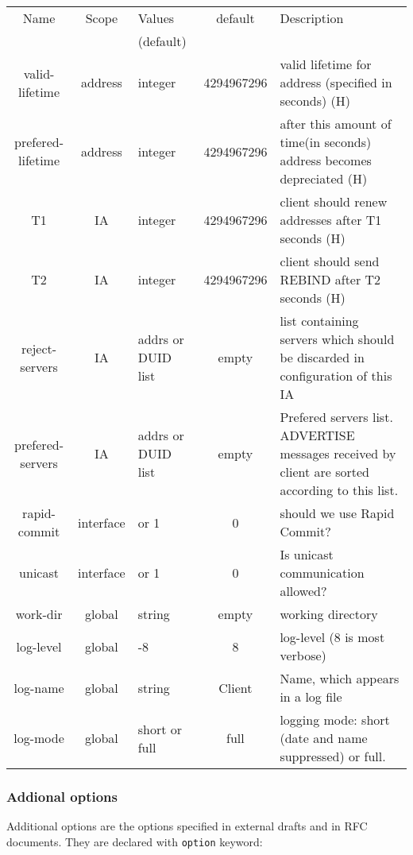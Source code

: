 \begin{center}
\begin{tabular}{|c|c|>{\centering}p{1.7cm}<{}|c|p{6cm}|}
\hline
Name              & Scope   & Values     & default    & Description \\
                  &         & (default)  &            & \\
\hline
valid-lifetime    & address & integer    & 4294967296 & valid lifetime for address (specified in seconds) (H)\\
prefered-lifetime & address & integer    & 4294967296 & after this amount of time(in seconds) address becomes depreciated (H)\\
T1                & IA      & integer    & 4294967296 & client should renew addresses after T1 seconds (H)\\
T2                & IA      & integer    & 4294967296 & client should send REBIND after T2 seconds (H)\\
reject-servers    & IA      & addrs or
                             DUID list  & empty      & list containing servers which should be discarded in configuration of this IA \\
prefered-servers  & IA      & addrs or 
                             DUID list  & empty      & Prefered servers list. ADVERTISE messages received by client are sorted according to this list. \\
rapid-commit      &interface& 0 or 1     & 0          & should we use Rapid Commit? \\
unicast           &interface& 0 or 1     & 0          & Is unicast communication allowed? \\
work-dir          & global  & string     & empty      & working directory \\
log-level         & global  & 1-8        & 8          & log-level (8 is most verbose) \\
log-name          & global  & string     & Client     & Name, which appears in a log file\\
log-mode          & global  &short or full& full      & logging mode: short (date and name suppressed) or full. \\
\hline
\end{tabular}
\end{center}

\subsubsection{Addional options}
Additional options are the options specified in external drafts and in RFC
documents. They are declared with \verb+option+ keyword:

